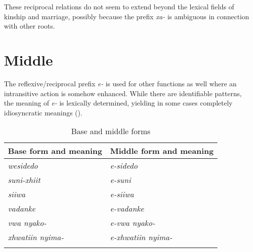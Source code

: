 These reciprocal relations do not seem to extend beyond the lexical fields of kinship and marriage, possibly because the prefix \textit{xa-}  is ambiguous in connection with other roots.

\section{Middle}
\label{ssec:mid}
The reflexive/reciprocal prefix \textit{e-} is used for other functions as well where %
an intransitive action is somehow enhanced. While there are identifiable patterns, the meaning of \textit{e-} is lexically determined, yielding in some cases completely idiosyncratic meanings ().

\begin{table}
	\caption{Base and middle forms}
	\begin{tabularx}{\linewidth}{QQ}
		\lsptoprule
		Base form and meaning & Middle form and meaning\\
		\midrule
		\textit{wesidedo}  & \textit{e-sidedo} \\
		\textit{suni-xhiit}  & \textit{e-suni} \\
		\midrule
		\textit{siiwa}  & \textit{e-siiwa} \\
		\textit{vadanke}  & \textit{e-vadanke} \\
		\textit{vwa nyako-}  & \textit{e-vwa nyako-} \\ 
		\textit{xhwatiin nyima-}  & \textit{e-xhwatiin nyima-} \\
		\lspbottomrule
	\end{tabularx}
	\label{tab:mid}
\end{table}


